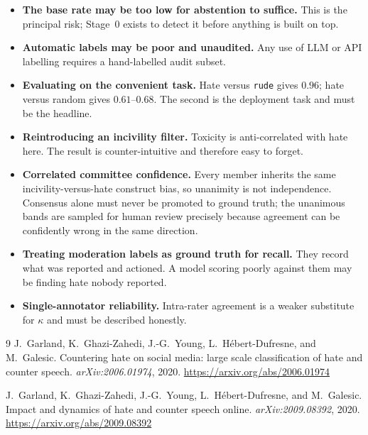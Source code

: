 \documentclass[11pt,a4paper]{article}
\begin{document}
\begin{itemize}
\item \textbf{The base rate may be too low for abstention to suffice.} This is the
      principal risk; Stage~0 exists to detect it before anything is built on top.
\item \textbf{Automatic labels may be poor and unaudited.} Any use of LLM or API
      labelling requires a hand-labelled audit subset.
\item \textbf{Evaluating on the convenient task.} Hate versus \texttt{rude} gives
      $0.96$; hate versus random gives $0.61$--$0.68$. The second is the deployment
      task and must be the headline.
\item \textbf{Reintroducing an incivility filter.} Toxicity is anti-correlated with
      hate here. The result is counter-intuitive and therefore easy to forget.
\item \textbf{Correlated committee confidence.} Every member inherits the same
      incivility-versus-hate construct bias, so unanimity is not independence.
      Consensus alone must never be promoted to ground truth; the unanimous bands
      are sampled for human review precisely because agreement can be confidently
      wrong in the same direction.
\item \textbf{Treating moderation labels as ground truth for recall.} They record
      what was reported and actioned. A model scoring poorly against them may be
      finding hate nobody reported.
\item \textbf{Single-annotator reliability.} Intra-rater agreement is a weaker
      substitute for $\kappa$ and must be described honestly.
\end{itemize}

\begin{thebibliography}{9}
J.~Garland, K.~Ghazi-Zahedi, J.-G.~Young, L.~H\'ebert-Dufresne, and M.~Galesic.
\newblock Countering hate on social media: large scale classification of hate and
counter speech.
\newblock \emph{arXiv:2006.01974}, 2020.
\newblock \url{https://arxiv.org/abs/2006.01974}

J.~Garland, K.~Ghazi-Zahedi, J.-G.~Young, L.~H\'ebert-Dufresne, and M.~Galesic.
\newblock Impact and dynamics of hate and counter speech online.
\newblock \emph{arXiv:2009.08392}, 2020.
\newblock \url{https://arxiv.org/abs/2009.08392}
\end{thebibliography}
\end{document}

